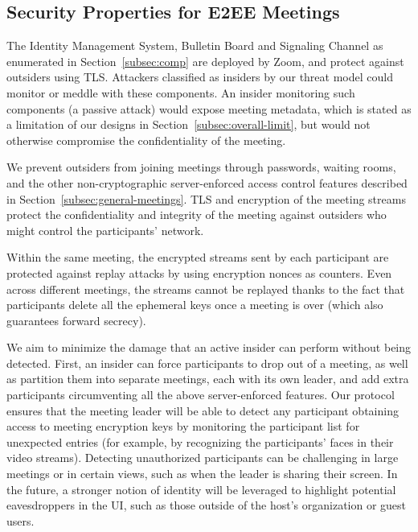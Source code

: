 \subsection{Security Properties for E2EE Meetings}
\label{subsec:secprop}
The Identity Management System, Bulletin Board and Signaling Channel as enumerated in
Section~\ref{subsec:comp} are deployed by Zoom, and protect against outsiders using TLS. Attackers
classified as insiders by our threat model could monitor or meddle with these components. An insider
monitoring such components (a passive attack) would expose meeting metadata, which is stated as a
limitation of our designs in Section~\ref{subsec:overall-limit}, but would not otherwise compromise
the confidentiality of the meeting.

We prevent outsiders from joining meetings through passwords, waiting rooms, and the other
non-cryptographic server-enforced access control features described in
Section~\ref{subsec:general-meetings}. TLS and encryption of the meeting streams protect the
confidentiality and integrity of the meeting against outsiders who might control the participants'
network.

Within the same meeting, the encrypted streams sent by each participant are protected against replay
attacks by using encryption nonces as counters. Even across different meetings, the streams cannot
be replayed thanks to the fact that participants delete all the ephemeral keys once a meeting is
over (which also guarantees forward secrecy). 

We aim to minimize the damage that an active insider can perform without being detected. First, an
insider can force participants to drop out of a meeting, as well as partition them into separate
meetings, each with its own leader, and add extra participants circumventing all the above
server-enforced features. Our protocol ensures that the meeting leader will be able to detect any
participant obtaining access to meeting encryption keys by monitoring the participant list for
unexpected entries (for example, by recognizing the participants' faces in their video streams).
Detecting unauthorized participants can be challenging in large meetings or in certain views, such
as when the leader is sharing their screen. In the future, a stronger notion of identity will be
leveraged to highlight potential eavesdroppers in the UI, such as those outside of the host's
organization or guest users.

